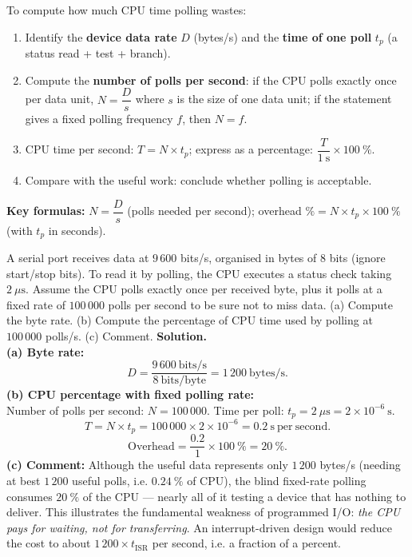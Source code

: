 \documentclass[11pt]{article}
\begin{document}
\begin{methode}
To compute how much CPU time polling wastes:
\begin{enumerate}
\item Identify the \textbf{device data rate} $D$ (bytes/s) and the \textbf{time of one poll} $t_p$ (a status read + test + branch).
\item Compute the \textbf{number of polls per second}: if the CPU polls exactly once per data unit, $N = \dfrac{D}{s}$ where $s$ is the size of one data unit; if the statement gives a fixed polling frequency $f$, then $N = f$.
\item CPU time per second: $T = N \times t_p$; express as a percentage: $\dfrac{T}{1\ \mathrm{s}}\times 100\ \%$.
\item Compare with the useful work: conclude whether polling is acceptable.
\end{enumerate}
\textbf{Key formulas:} $N = \dfrac{D}{s}$ (polls needed per second); overhead $\% = N \times t_p \times 100\ \%$ (with $t_p$ in seconds).
\end{methode}

\begin{exoresolu}
A serial port receives data at $9\,600$ bits/s, organised in bytes of 8 bits (ignore start/stop bits). To read it by polling, the CPU executes a status check taking $2\ \mu\mathrm{s}$. Assume the CPU polls exactly once per received byte, plus it polls at a fixed rate of $100\,000$ polls per second to be sure not to miss data. (a) Compute the byte rate. (b) Compute the percentage of CPU time used by polling at $100\,000$ polls/s. (c) Comment.
\tcblower
\textbf{Solution.}\\
\textbf{(a) Byte rate:}
\[
D = \frac{9\,600\ \text{bits/s}}{8\ \text{bits/byte}} = 1\,200\ \text{bytes/s}.
\]
\textbf{(b) CPU percentage with fixed polling rate:}\\
Number of polls per second: $N = 100\,000$. Time per poll: $t_p = 2\ \mu\mathrm{s} = 2\times 10^{-6}\ \mathrm{s}$.
\[
T = N \times t_p = 100\,000 \times 2\times 10^{-6} = 0.2\ \mathrm{s\ per\ second}.
\]
\[
\text{Overhead} = \frac{0.2}{1}\times 100\ \% = 20\ \%.
\]
\textbf{(c) Comment:} Although the useful data represents only $1\,200$ bytes/s (needing at best $1\,200$ useful polls, i.e. $0.24\ \%$ of CPU), the blind fixed-rate polling consumes $20\ \%$ of the CPU --- nearly all of it testing a device that has nothing to deliver. This illustrates the fundamental weakness of programmed I/O: \emph{the CPU pays for waiting, not for transferring}. An interrupt-driven design would reduce the cost to about $1\,200 \times t_{\text{ISR}}$ per second, i.e. a fraction of a percent.
\end{exoresolu}
\end{document}
